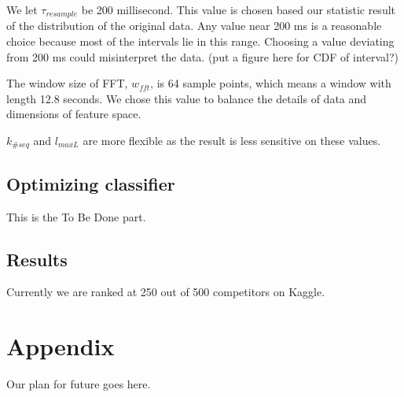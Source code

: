\documentclass{article} %
\begin{document}
We let $\tau_{resample}$ be 200 millisecond. This value is chosen based our statistic result of the distribution of the original data. Any value near 200 ms is a reasonable choice because most of the intervals lie in this range. Choosing a value deviating from 200 ms could misinterpret the data. (put a figure here for CDF of interval?)

The window size of FFT, $w_{fft}$, is 64 sample points, which means a window with length 12.8 seconds. We chose this value to balance the details of data and dimensions of feature space. 

$k_{\#seq}$ and  $l_{maxL}$ are more flexible as the result is less sensitive on these values.

\subsection{Optimizing classifier}
This is the To Be Done part.

\subsection{Results}

Currently we are ranked at 250 out of 500 competitors on Kaggle.

\section*{Appendix}

Our plan for future goes here.




\end{document}
